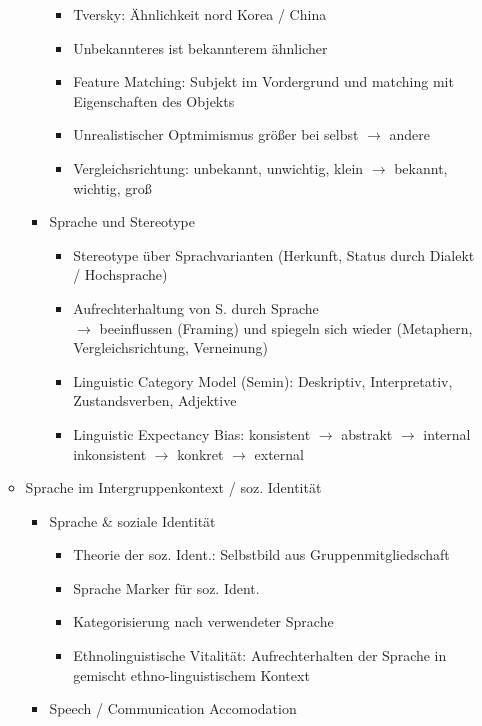 \documentclass[11pt, paper=a4, twocolumn]{scrartcl}
\begin{document}
\begin{itemize}
\begin{itemize}
\begin{itemize}
\begin{itemize}
									\item Tversky: Ähnlichkeit nord Korea / China
									\item Unbekannteres ist bekannterem ähnlicher
									\item Feature Matching: Subjekt im Vordergrund und matching mit Eigenschaften 
										des Objekts
									\item Unrealistischer Optmimismus größer bei selbst $\rightarrow$ andere
									\item Vergleichsrichtung: unbekannt, unwichtig, klein $\rightarrow$ bekannt, 
										wichtig, groß
								\end{itemize}
							\item Sprache und Stereotype
								\begin{itemize}
									\item Stereotype über Sprachvarianten (Herkunft, Status durch Dialekt / 
										Hochsprache)
									\item Aufrechterhaltung von S. durch Sprache\\
										$\rightarrow$ beeinflussen (Framing) und spiegeln sich wieder 
										(Metaphern, Vergleichsrichtung, Verneinung)
									\item Linguistic Category Model (Semin): Deskriptiv, Interpretativ, 
										Zustandsverben, Adjektive
									\item Linguistic Expectancy Bias: konsistent $\rightarrow$ abstrakt 
										$\rightarrow$ internal\\
										inkonsistent $\rightarrow$ konkret $\rightarrow$ external
								\end{itemize}
						\end{itemize}
					\item Sprache im Intergruppenkontext / soz. Identität
						\begin{itemize}
							\item Sprache \& soziale Identität
								\begin{itemize}
									\item Theorie der soz. Ident.: Selbstbild aus Gruppenmitgliedschaft
									\item Sprache Marker für soz. Ident.
									\item Kategorisierung nach verwendeter Sprache
									\item Ethnolinguistische Vitalität: Aufrechterhalten der Sprache in gemischt 
										ethno-linguistischem Kontext
								\end{itemize}
							\item Speech / Communication Accomodation

\end{itemize}
\end{itemize}
\end{itemize}
\end{document}
